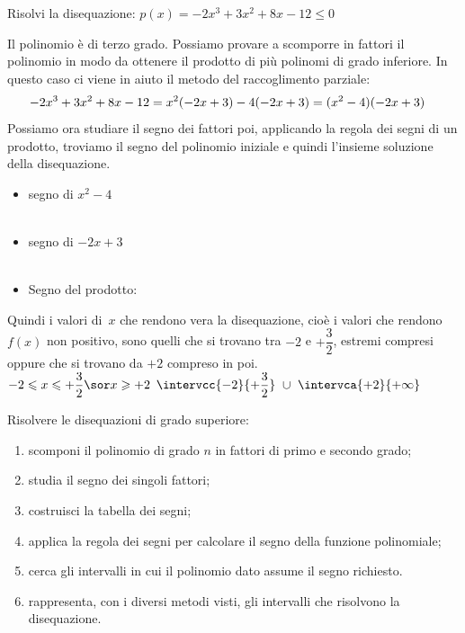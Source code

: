 \begin{esempio}{}{}
Risolvi la disequazione: \quad \(p(x)=-2x^3+3x^2+8x-12 \leqslant 0\)

Il polinomio è di terzo grado. 
Possiamo provare a scomporre in fattori il polinomio in modo da 
ottenere il prodotto di più polinomi di grado inferiore. 
In questo caso ci viene in aiuto il metodo del raccoglimento 
parziale:\\[-4mm]
\begin{align*} \small
-2x^3+3x^2+8x-12 &= x^2(-2x+3)-4(-2x+3) = (x^2-4)(-2x+3)
\end{align*}
Possiamo ora studiare il segno dei fattori poi, applicando la 
regola dei segni di un prodotto, troviamo il segno del polinomio 
iniziale e quindi l'insieme soluzione della disequazione.

\begin{itemize}[left=0mm]
\item segno di \(x^2-4\)\\[-2mm]
\\
\item  segno di \(-2x+3\)\\%
\\
\item Segno del prodotto: \quad %
\raisebox{-10mm}
{
{\grrsegnoprodottoa}}
\end{itemize}

Quindi i valori di~\(x\) che rendono vera la disequazione, cioè i 
valori che rendono~\(f(x)\) non positivo, sono quelli 
che si trovano tra \(-2\) e \(+\dfrac{3}{2}\), estremi compresi oppure 
che si trovano da \(+2\) compreso in poi.\\
\inssol
  {\solprodottoa}
  {\(-2 \leqslant x \leqslant +\dfrac{3}{2} \sor x \geqslant +2\)}
  {\(\intervcc{-2}{+\dfrac{3}{2}}~\cup~\intervca{+2}{+\infty}\)}
\end{esempio}

\begin{procedura}{}{}
Risolvere le disequazioni di grado superiore:
\begin{enumerate} [noitemsep]
\item scomponi il polinomio di grado \(n\) in fattori di primo e secondo 
grado;
\item studia il segno dei singoli fattori;
\item costruisci la tabella dei segni;
\item applica la regola dei segni per calcolare il segno della funzione 
polinomiale;
\item cerca gli intervalli in cui il polinomio dato assume il segno 
richiesto.
\item rappresenta, con i diversi metodi visti, gli intervalli che 
 risolvono la disequazione.
\end{enumerate}
\end{procedura}

